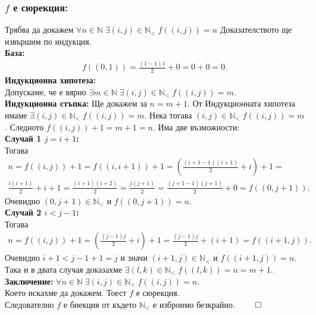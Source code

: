 \documentclass[a4paper, 12pt, oneside]{article}
\newcommand{\N}{\mathbb{N}}
\newcommand{\LN}{\N_<}
\begin{document}
\subsubsection*{\(f\) е сюрекция:}
Трябва да докажем \(\forall n \in \N \; \exists (i, j) \in \LN \; f((i, j)) = n\)
Доказателството ще извършим по индукция. \\
\textbf{База:} \\
\begin{align*}
    f((0, 1)) = \displaystyle\frac{(1 - 1)1}{2} + 0 = 0 + 0 = 0.
\end{align*}
\textbf{Индукционна хипотеза:} \\
Допускаме, че е вярно \(\exists m \in \N \; \exists (i, j) \in \LN \; f((i, j)) = m\). \\
\textbf{Индукционна стъпка:}
Ще докажем за \(n = m + 1\). От Индукционната хипотеза имаме \(\exists (i, j) \in \LN \; f((i, j)) = m\).
Нека тогава \((i, j) \in \LN \; f((i, j)) = m\). Следното \(f((i, j)) + 1 = m + 1 = n\).
Има две възможности: \\
\textbf{Случай 1 \(j = i + 1\):} \\
Тогава
\begin{align*}
    n = f((i, j)) + 1 = f((i, i + 1)) + 1 = \left(\displaystyle\frac{(i + 1 - 1)(i + 1)}{2} + i\right) + 1 = \\
    \displaystyle\frac{i(i + 1)}{2} + i + 1 = \displaystyle\frac{(i + 1)(i + 2)}{2} = \displaystyle\frac{j(j + 1)}{2} = \displaystyle\frac{(j + 1 - 1)(j + 1)}{2} + 0 = f((0, j + 1)).
\end{align*}
Очевидно \((0, j + 1) \in \LN\) и \(f((0, j + 1)) = n\). \\
\textbf{Случай 2 \(i < j - 1\):} \\
Тогава
\begin{align*}
    n = f((i, j)) + 1 = \left(\displaystyle\frac{(j - 1)j}{2} + i\right) + 1 = \displaystyle\frac{(j - 1)j}{2} + (i + 1) = f((i + 1, j)).
\end{align*}
Очевидно \(i + 1 < j - 1 + 1 = j\) и значи \((i + 1, j) \in \LN\) и \(f((i + 1, j)) = n\). \\
Така и в двата случая доказахме \(\exists (l, k) \in \LN \; f((l, k)) = n = m + 1\). \\
\textbf{Заключение:}
\(\forall n \in \N \; \exists (i, j) \in \LN \; f((i, j)) = n\). \\
Което искахме да докажем. Тоест \(f\) е сюрекция. \\
Следователно \(f\) е биекция от където \(\LN\) е изброимо безкрайно. \(\qed\)
\end{document}
